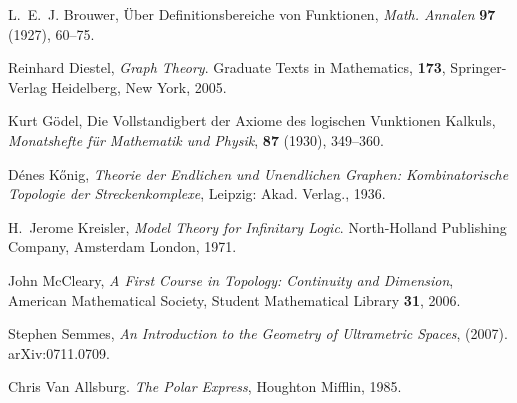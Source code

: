 \documentclass[12pt]{amsart}
\theoremstyle{plain}
\theoremstyle{definition}
\theoremstyle{remark}
\begin{document}
\begin{thebibliography}{99}

 L.~E.~J. Brouwer, \"Uber
  {D}efinitionsbereiche von {F}unktionen, \emph{Math. Annalen} \textbf{97}
  (1927), 60--75. 
  
 Reinhard Diestel, \emph{Graph Theory}. Graduate
  Texts in Mathematics, \textbf{173}, Springer-Verlag Heidelberg, New
  York, 2005.

 Kurt G\"odel, Die Vollstandigbert der Axiome
  des logischen Vunktionen Kalkuls, \emph{Monatshefte f\"ur
  Mathematik und Physik}, \textbf{87} (1930), 349--360.
  
 D\'enes K\H{o}nig, \emph{Theorie der Endlichen und
  Unendlichen Graphen: Kombinatorische Topologie der
  Streckenkomplexe}, Leipzig: Akad. Verlag., 1936.
  
 H.~Jerome Kreisler, \emph{Model Theory for Infinitary
 Logic}. North-Holland Publishing Company, Amsterdam London, 1971.

 John McCleary, \emph{A First Course in Topology:
  Continuity and Dimension}, American Mathematical Society, Student
  Mathematical Library \textbf{31}, 2006.
  
 Stephen Semmes, \emph{An Introduction to the
  Geometry of Ultrametric Spaces}, (2007). arXiv:0711.0709.
  
 Chris Van Allsburg. \emph{The Polar Express}, 
  Houghton Mifflin, 1985. 

\end{thebibliography}
\end{document}
